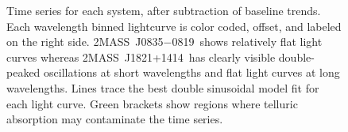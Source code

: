 \documentclass[twocolumn]{aastex6}
\newcommand{\sha}{2MASS~J0835$-$0819}
\newcommand{\shb}{2MASS~J1821+1414}
\begin{document}

\begin{figure}[!t]
\centering
{}
	\caption{Time series for each system, after subtraction of baseline trends. Each wavelength binned lightcurve is color coded, offset, and labeled on the right side. \sha\ shows relatively flat light curves whereas \shb\ has clearly visible double-peaked oscillations at short wavelengths and flat light curves at long wavelengths.
	Lines trace the best double sinusoidal model fit for each light curve.
	Green brackets show regions where telluric absorption may contaminate the time series.}
	\label{fig:tserDetrend}
\end{figure} 
\end{document}
